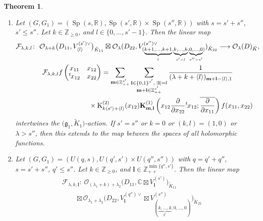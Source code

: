 \documentclass[pdftex]{sigma}
\numberwithin{equation}{section}
\newtheorem{Theorem}{Theorem}[section]
\newcommand{\bK}{\mathbf{K}}
\newcommand{\bl}{\mathbf{l}}
\newcommand{\bm}{\mathbf{m}}
\newcommand{\BZ}{\mathbb{Z}}
\newcommand{\BR}{\mathbb{R}}
\newcommand{\BC}{\mathbb{C}}
\newcommand{\fg}{\mathfrak{g}}
\newcommand{\cF}{\mathcal{F}}
\newcommand{\cO}{\mathcal{O}}
\newcommand{\rK}{\mathrm{K}}
\begin{document}
\begin{Theorem}\label{main1}\quad
\begin{enumerate}\itemsep=0pt
\item[$(1)$] Let $(G,G_1)=(\operatorname{Sp}(s,\BR), \operatorname{Sp}(s',\BR)\times \operatorname{Sp}(s'',\BR))$ with $s=s'+s''$, $s'\le s''$.
Let $k\in\BZ_{\ge 0}$, and $l\in\{0,\ldots,s'-1\}$. Then the linear map
\begin{gather*}
\cF_{\lambda,k,l}\colon \ \cO_{\lambda+k}\big(D_{11},V_{\langle l\rangle}^{(s')\vee}\big)_{\tilde{K}_{11}}\boxtimes
\cO_{\lambda}(D_{22},V_{(\underbrace{\scriptstyle k+1,\ldots,k+1}_l,\underbrace{\scriptstyle k,\ldots,k}_{s'-l},
\underbrace{\scriptstyle 0,\ldots,0}_{s''-s'})}^{(s'')\vee})_{\tilde{K}_{22}}
\longrightarrow \cO_\lambda(D)_{\tilde{K}},\\
\cF_{\lambda,k,l}f\begin{pmatrix}x_{11}&x_{12}\\{}^t\hspace{-1pt}x_{12}&x_{22}\end{pmatrix}
=\sum_{\bm\in\BZ_{++}^{s'}}\sum_{\substack{\bl\in\{0,1\}^{s'},\; |\bl|=l\\ \bm+\bl\in\BZ_{++}^{s'}}}
\frac{1}{(\lambda+k+\langle l\rangle)_{\bm+\bl-\langle l\rangle,1}}\\
\hphantom{\cF_{\lambda,k,l}f\begin{pmatrix}x_{11}&x_{12}\\{}^t\hspace{-1pt}x_{12}&x_{22}\end{pmatrix}=}{}
\times \rK_{k\langle s'\rangle+\langle l\rangle}^{(2)}(x_{12})
\bK_{\bm,\bl}^{(1)}\left(x_{12}\frac{\partial}{\partial x_{22}}{}^t\hspace{-1pt}x_{12};
\overline{\frac{\partial}{\partial x_{11}}}\right)f(x_{11},x_{22})
\end{gather*}
intertwines the $\big(\fg_1,\tilde{K}_1\big)$-action. If $s'=s''$ or $k=0$ or $(k,l)=(1,0)$ or $\lambda>s''$,
then this extends to the map between the spaces of all holomorphic functions.
\item[$(2)$] Let $(G,G_1)=(U(q,s), U(q',s')\times U(q'',s''))$ with $q=q'+q''$, $s=s'+s''$, $q'\le s''$.
Let $k\in\BZ_{\ge 0}$, and $\bl\in\BZ_{++}^{\min\{q'',s'\}}$.
Then the linear map
\begin{gather*}
\cF_{\lambda,k,\bl}\colon \ \cO_{(\lambda_1+k)+\lambda_2}\big(D_{11},\BC\boxtimes V_\bl^{(s')}\big)_{\tilde{K}_{11}}\\
\qquad {} \boxtimes
\cO_{\lambda_1+\lambda_2}\big(D_{22},V_\bl^{(q'')\vee} \boxtimes V_{(\underbrace{\scriptstyle k,\ldots,k}_{q'},0,\ldots,0)}^{(s'')}\big)_{\tilde{K}_{22}}

\end{gather*}
\end{enumerate}
\end{Theorem}
\end{document}

